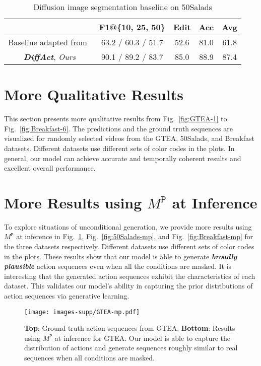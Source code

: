 \documentclass[10pt,twocolumn,letterpaper]{article}
\begin{document}
\begin{table}[t]
\begin{center}
\scriptsize
\begin{tabular}{c | c c c c c c }
\hline
  & \multicolumn{3}{c}{F1@\{10, 25, 50\}} & Edit & Acc & Avg \\
\hline
Baseline adapted from~\cite{SegDiff,MedSegDiff} & \multicolumn{3}{c}{ 63.2 / 60.3 / 51.7 } & 52.6 & 81.0 & 61.8 \\
\textbf{\textit{DiffAct}}, \textit{Ours} & \multicolumn{3}{c}{ 90.1 / 89.2 / 83.7} & 85.0 & 88.9 & 87.4 \\
\hline
\end{tabular}
\end{center}
\caption{Diffusion image segmentation baseline on 50Salads}
\label{table:image-baseline}
\end{table}


\section{More Qualitative Results}

This section presents more qualitative results from Fig.~\ref{fig:GTEA-1} to Fig.~\ref{fig:Breakfast-6}.
The predictions and the ground truth sequences are visualized for randomly selected videos from the GTEA, 50Salads, and Breakfast datasets.
Different datasets use different sets of color codes in the plots.
In general, our model can achieve accurate and temporally coherent results and excellent overall performance.

\section{More Results using $M^\mathtt{P}$ at Inference}

To explore situations of unconditional generation, we provide more results using $M^\mathtt{P}$ at inference in Fig.~\ref{fig:GTEA-mp}, Fig.~\ref{fig:50Salads-mp}, and Fig.~\ref{fig:Breakfast-mp} for the three datasets respectively. 
Different datasets use different sets of color codes in the plots.
These results show that our model is able to generate \textbf{\textit{broadly plausible}} action sequences even when all the conditions are masked.
It is interesting that the generated action sequences exhibit the characteristics of each dataset.
This validates our model's ability in capturing the prior distributions of action sequences via generative learning.


\begin{figure}[t]
\vspace{-2.5cm}
\begin{center}
   \texttt{[image: images-supp/GTEA-mp.pdf]}
\end{center}
   \caption{\textbf{Top}: Ground truth action sequences from GTEA. \textbf{Bottom}: Results using $M^\mathtt{P}$ at inference for GTEA. Our model is able to capture the distribution of actions and generate sequences roughly similar to real sequences when all conditions are masked.}
\label{fig:GTEA-mp}
\end{figure}
\end{document}
